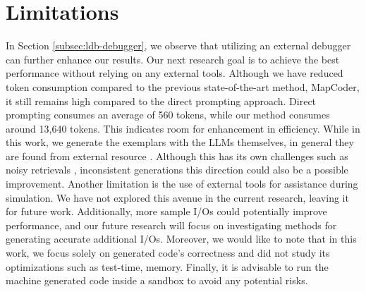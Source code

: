 
\section{Limitations}
In Section \ref{subsec:ldb-debugger}, we observe that utilizing an external debugger can further enhance our results. Our next research goal is to achieve the best performance without relying on any external tools. Although we have reduced token consumption compared to the previous state-of-the-art method, MapCoder, it still remains high compared to the direct prompting approach. Direct prompting consumes an average of 560 tokens, while our method consumes around 13,640 tokens. This indicates room for enhancement in efficiency. While in this work, we generate the exemplars with the LLMs themselves, in general they are found from external resource \cite{parvez-chang-2021-evaluating}. Although this has its own challenges such as noisy retrievals \cite{filco}, inconsistent generations \cite{islam-etal-2024-open, parvez2024evidence, sadat-etal-2023-delucionqa} this direction could also be a possible improvement. Another limitation is the use of external tools for assistance during simulation. We have not explored this avenue in the current research, leaving it for future work. Additionally, more sample I/Os could potentially improve performance, and our future research will focus on investigating methods for generating accurate additional I/Os. Moreover, we would like to note that in this work, we focus solely on generated code's correctness and did not study its optimizations such as test-time, memory. Finally, it is advisable to run the machine generated code inside a sandbox to avoid any potential risks.
